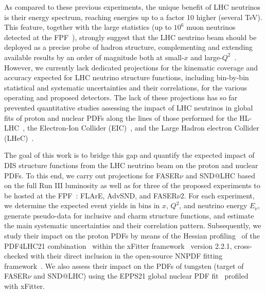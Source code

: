 As compared to these previous experiments,
the unique benefit of LHC neutrinos is their energy spectrum, reaching
energies up to a factor 10 higher (several TeV).
%
This feature, together with the large statistics (up to $10^6$ muon neutrinos detected at the FPF~\cite{Kling:2021gos}),  strongly suggest that the LHC  neutrino beam should be
deployed as a precise probe of hadron structure, complementing
and extending available results by an order of magnitude both at small-$x$
and large-$Q^2$~\cite{Feng:2022inv}.
%
However, we currently lack  dedicated projections for the kinematic coverage
and accuracy expected for LHC neutrino structure functions,
including bin-by-bin statistical and systematic uncertainties and their
correlations, for the various operating and proposed detectors.
%
The lack of these projections
has so far prevented quantitative studies assessing the impact
of LHC neutrinos in global fits of proton and nuclear PDFs along the lines
of those performed for the HL-LHC~\cite{AbdulKhalek:2018rok}, the Electron-Ion Collider (EIC)~\cite{AbdulKhalek:2021gbh,Khalek:2021ulf}, and the
Large Hadron electron Collider (LHeC)~\cite{AbdulKhalek:2019mps,LHeC:2020van}. 

The goal of this work is to bridge this gap and quantify
the expected impact of  DIS structure functions from the LHC
neutrino beam on the proton and nuclear PDFs.
%
To this end, we carry out projections for  FASER$\nu$ and SND@LHC based on the full Run III luminosity
as well as for  three of the proposed experiments to be hosted
at the FPF~\cite{Anchordoqui:2021ghd,Feng:2022inv}: FLArE, AdvSND, and FASER$\nu$2.
%
For each experiment, we determine the expected event yields in bins in $x$, $Q^2$,
and neutrino energy $E_\nu$,
generate pseudo-data for  inclusive and charm 
structure functions, 
and estimate the main systematic uncertainties and their correlation pattern.
%
Subsequently, we study their impact on the proton PDFs by means of the Hessian profiling~\cite{Paukkunen:2014zia,  Schmidt:2018hvu, AbdulKhalek:2018rok, HERAFitterdevelopersTeam:2015cre}
of the PDF4LHC21 combination~\cite{PDF4LHCWorkingGroup:2022cjn}
within the  {\sc\small xFitter} framework~\cite{Alekhin:2014irh, Bertone:2017tig, xFitter:2022zjb, xFitter:web} version 2.2.1, 
cross-checked with their direct inclusion in the open-source NNPDF fitting framework~\cite{NNPDF:2021uiq}.
%
We also assess their impact on the PDFs of tungsten (target of FASER$\nu$ and SND@LHC)
using the EPPS21 global nuclear PDF fit~\cite{Eskola:2021nhw}
profiled with {\sc\small xFitter}.

